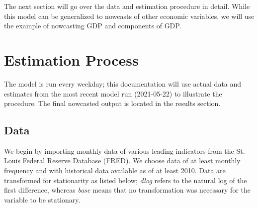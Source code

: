 \documentclass[11pt, letterpaper]{article}\usepackage[]{graphicx}\usepackage[]{color}
\begin{document}
The next section will go over the data and estimation procedure in detail. While this model can be generalized to nowcasts of other economic variables, we will use the example of nowcasting GDP and components of GDP.

\newpage
\section{Estimation Process}
The model is run every weekday; this documentation will use actual data and estimates from the most recent model run (2021-05-22) to illustrate the procedure. The final nowcasted output is located in the results section.

\subsection{Data}
We begin by importing monthly data of various leading indicators from the St. Louis Federal Reserve Database (FRED). We choose data of at least monthly frequency and with historical data available as of at least 2010. Data are transformed for stationarity as listed below; \textit{dlog} refers to the natural log of the first difference, whereas \textit{base} means that no transformation was necessary for the variable to be stationary.
\end{document}
